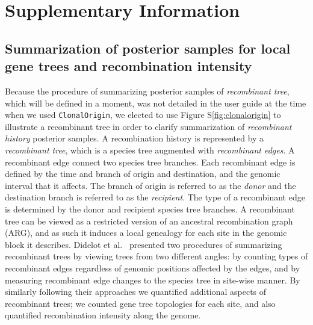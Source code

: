 \documentclass[10pt]{article}
\let\citet\cite
\begin{document}
\section{Supplementary Information}

\subsection{Summarization of posterior samples for local gene trees and recombination intensity}

Because the procedure of summarizing posterior samples of \textit{recombinant
tree}, which will be defined in a moment, was not detailed in the user guide at
the time when we used \texttt{ClonalOrigin}, we elected to use Figure
S\ref{fig:clonalorigin} to illustrate a recombinant tree in order to clarify
summarization of \textit{recombinant history} posterior samples.  A
recombination history is represented by a \textit{recombinant tree}, which is a
species tree augmented with \textit{recombinant edges}.  A recombinant edge
connect two species tree branches.  Each recombinant edge is defined by the time
and branch of origin and destination, and the genomic interval that it affects.
The branch of origin is referred to as the \textit{donor} and the destination
branch is referred to as the \textit{recipient}. The type of a recombinant edge
is determined by the donor and recipient species tree branches.  A recombinant
tree can be viewed as a restricted version of an ancestral recombination graph
(ARG), and as such it induces a local genealogy for each site in the genomic
block it describes.  Didelot et al.\ \citet{Didelot2010} presented two procedures of summarizing
recombinant trees by viewing trees from two different angles: by counting types
of recombinant edges regardless of genomic positions affected by the edges, and
by measuring recombinant edge changes to the species tree in site-wise manner.
By similarly following their approaches we quantified additional aspects of
recombinant trees; we counted gene tree topologies for each site, and also
quantified recombination intensity along the genome.
\end{document}
